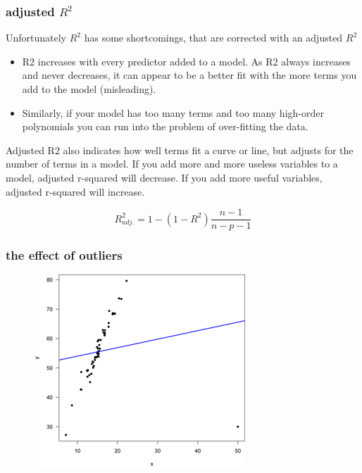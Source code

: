 \documentclass{beamer}
\begin{document}
\begin{frame}
\frametitle{adjusted $R^2$ }
Unfortunately $R^2$ has some shortcomings, that are corrected with an adjusted $R^2$
\begin{itemize}
\item R2 increases with every predictor added to a model. As R2 always increases and never decreases, it can appear to be a better fit with the more terms you add to the model (misleading).
\item Similarly, if your model has too many terms and too many high-order polynomials you can run into the problem of over-fitting the data.
\end{itemize}
Adjusted R2 also indicates how well terms fit a curve or line, but adjusts for the number of terms in a model. If you add more and more useless variables to a model, adjusted r-squared will decrease. If you add more useful variables, adjusted r-squared will increase.

\begin{equation}
R^2_{adj.} = 1- (1-R^2) \frac{n-1}{n-p-1}
\end{equation}
\end{frame}

\begin{frame}
\frametitle{the effect of outliers}
\begin{figure}
\includegraphics[width=0.8\linewidth]{figures/03/outlier.png}
\end{figure}
\end{frame}
\end{document}
